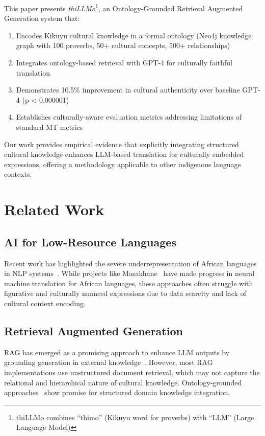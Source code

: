 \documentclass[sigconf,nonacm]{acmart}
\begin{document}
This paper presents \textit{thiLLMo}\footnote{thiLLMo combines ``thimo'' (Kikuyu word for proverbs) with ``LLM'' (Large Language Model)}, an Ontology-Grounded Retrieval Augmented Generation system that:

\begin{enumerate}
    \item Encodes Kikuyu cultural knowledge in a formal ontology (Neo4j knowledge graph with 100 proverbs, 50+ cultural concepts, 500+ relationships)
    \item Integrates ontology-based retrieval with GPT-4 for culturally faithful translation
    \item Demonstrates 10.5\% improvement in cultural authenticity over baseline GPT-4 (p < 0.000001)
    \item Establishes culturally-aware evaluation metrics addressing limitations of standard MT metrics
\end{enumerate}

Our work provides empirical evidence that explicitly integrating structured cultural knowledge enhances LLM-based translation for culturally embedded expressions, offering a methodology applicable to other indigenous language contexts.

\section{Related Work}

\subsection{AI for Low-Resource Languages}

Recent work has highlighted the severe underrepresentation of African languages in NLP systems~\cite{nekoto2020participatory}. While projects like Masakhane~\cite{orife2020masakhane} have made progress in neural machine translation for African languages, these approaches often struggle with figurative and culturally nuanced expressions due to data scarcity and lack of cultural context encoding.

\subsection{Retrieval Augmented Generation}

RAG has emerged as a promising approach to enhance LLM outputs by grounding generation in external knowledge~\cite{lewis2020retrieval}. However, most RAG implementations use unstructured document retrieval, which may not capture the relational and hierarchical nature of cultural knowledge. Ontology-grounded approaches~\cite{li2024ontology} show promise for structured domain knowledge integration.
\end{document}
